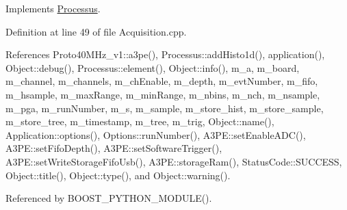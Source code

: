 Implements \hyperlink{classProcessus_aee88ad7b77ae7319cf8b128e9dd2ea11}{Processus}.

Definition at line 49 of file Acquisition.cpp.

References Proto40MHz\_\-v1::a3pe(), Processus::addHisto1d(), application(), Object::debug(), Processus::element(), Object::info(), m\_\-a, m\_\-board, m\_\-channel, m\_\-channels, m\_\-chEnable, m\_\-depth, m\_\-evtNumber, m\_\-fifo, m\_\-hsample, m\_\-maxRange, m\_\-minRange, m\_\-nbins, m\_\-nch, m\_\-nsample, m\_\-pga, m\_\-runNumber, m\_\-s, m\_\-sample, m\_\-store\_\-hist, m\_\-store\_\-sample, m\_\-store\_\-tree, m\_\-timestamp, m\_\-tree, m\_\-trig, Object::name(), Application::options(), Options::runNumber(), A3PE::setEnableADC(), A3PE::setFifoDepth(), A3PE::setSoftwareTrigger(), A3PE::setWriteStorageFifoUsb(), A3PE::storageRam(), StatusCode::SUCCESS, Object::title(), Object::type(), and Object::warning().

Referenced by BOOST\_\-PYTHON\_\-MODULE().


